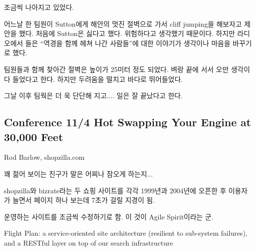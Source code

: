 \documentclass[a4paper]{article}
\begin{document}
조금씩 나아지고 있었다.
 
어느날 한 팀원이 Sutton에게 해안의 멋진 절벽으로 가서 cliff jumping을
해보자고 제안을 했다. 처음에 Sutton은 싫다고 했다. 위험하다고 생각했기
때문이다.  하지만 라디오에서 들은 ``역경을 함께 헤쳐 나간 사람들''에 대한
이야기가 생각이나 마음을 바꾸기로 했다.
 
팀원들과 함께 찾아간 절벽은 높이가 25미터 정도 되었다. 벼랑 끝에 서서
오만 생각이 다 들었다고 한다. 하지만 두려움을 떨치고 바다로
뛰어들었다.
 
그날 이후 팀웍은 더 욱 단단해 지고.... 일은 잘 끝났다고 한다.
 
\subsection{Conference 11/4 Hot Swapping Your Engine at 30,000 Feet}
 
Rod Barlow, shopzilla.com
 
꽤 젊어 보이는 친구가 말은 어찌나 잠오게 하는지...
 
shopzilla와 bizrate라는 두 쇼핑 사이트를 각각 1999년과 2004년에 오픈한
후 이용자가 늘면서 페이지 하나 보는데 7초가 걸릴 지경이 됨.
 
운영하는 사이트를 조금씩 수정하기로 함. 이 것이 Agile Spirit이라는 군.
 
Flight Plan: a service-oriented site architecture (resilient to
sub-system failures), and a RESTful layer on top of our search
infrastructure
 
\end{document}
